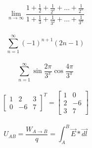 \documentclass[12pt]{article}
\begin{document}
\\
$$ \lim_{n \rightarrow \infty} \frac{1+ \frac{1}{2}+ \frac{1}{2^{2}} + \ldots + \frac{1}{2^n}}{1+ \frac{1}{3} + \frac{1}{3^2}+ \ldots + \frac{1}{3^n}}$$
\\
$$\sum_{n=1}^{\infty} (-1)^{n+1} (2n-1) $$
\\
$$\sum_{n=1}^{\infty} \sin \frac{2\pi}{3^{\pi}} \cos \frac{4\pi}{3^{\pi}}$$
\\
$$\begin{bmatrix}
1 & 2 & 3\\
0 & -6 & 7
\end{bmatrix}^T
=
\begin{bmatrix}
1 & 0\\
2 & -6\\
3 & 7
\end{bmatrix}$$
\\
$$ U_{AB}= \frac{W_{A \rightarrow B}}{q} = \int^{B}_A  \vec{E} * \vec{dl} $$
\end{document}
